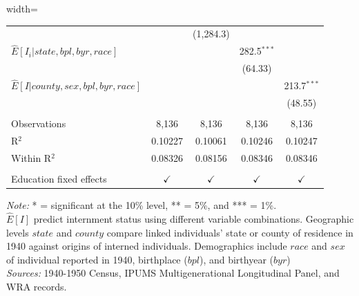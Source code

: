 \begin{table}[htbp]
\begin{adjustbox}{width=\textwidth}
\begin{tabular}{lcccc}
                                                &                 & (1,284.3)       &                 &   \\   
      $\hat{E}[I_i|state, bpl, byr, race]$      &                 &                 & 282.5$^{***}$   &   \\   
                                                &                 &                 & (64.33)         &   \\   
      $\hat{E}[I|county, sex, bpl, byr, race]$  &                 &                 &                 & 213.7$^{***}$\\   
                                                &                 &                 &                 & (48.55)\\   
       \\
      Observations                              & 8,136           & 8,136           & 8,136           & 8,136\\  
      R$^2$                                     & 0.10227         & 0.10061         & 0.10246         & 0.10247\\  
      Within R$^2$                              & 0.08326         & 0.08156         & 0.08346         & 0.08346\\  
       \\
      Education fixed effects                   & $\checkmark$    & $\checkmark$    & $\checkmark$    & $\checkmark$\\   
      \bottomrule
   \end{tabular}
\end{adjustbox}
   {\footnotesize
   \emph{Note:}
   * = significant at the 10\% level,
   ** = 5\%, and
   *** = 1\%. \\
   $\hat{E}[I]$ predict internment status using different variable combinations.
   Geographic levels $state$ and $county$ compare linked individuals'
   state or county of residence in 1940 against origins of interned individuals.
   Demographics include $race$ and $sex$ of individual reported in 1940,
   birthplace ($bpl$), and birthyear ($byr$) \\
   \emph{Sources:} 1940-1950 Census, IPUMS Multigenerational Longitudinal Panel, and WRA records.
   }
\end{table}